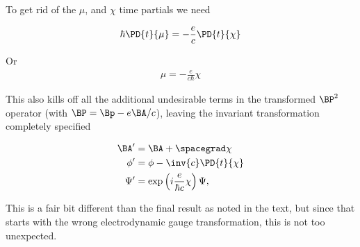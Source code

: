 To get rid of the $\mu$, and $\chi$ time partials we need

\begin{align*}
\hbar \PD{t}{\mu} = - \frac{e}{c} \PD{t}{\chi}
\end{align*}

Or 
\begin{align*}
\mu = - \frac{e}{c\hbar} \chi
\end{align*}

This also kills off all the additional undesirable terms in the transformed $\BP^2$ operator (with $\BP = \Bp - e \BA/c$), leaving the invariant transformation completely specified

\begin{align*}
\BA' &= \BA + \spacegrad \chi \\
\phi' &= \phi - \inv{c} \PD{t}{ \chi } \\
\Psi' &= \exp\left( i \frac{e}{ \hbar c } \chi \right) \Psi,
\end{align*}

This is a fair bit different than the final result as noted in the text, but since that starts with the wrong electrodynamic gauge transformation, this is not too unexpected.

%
%
%
%
%
%

\EndNoBibArticle
